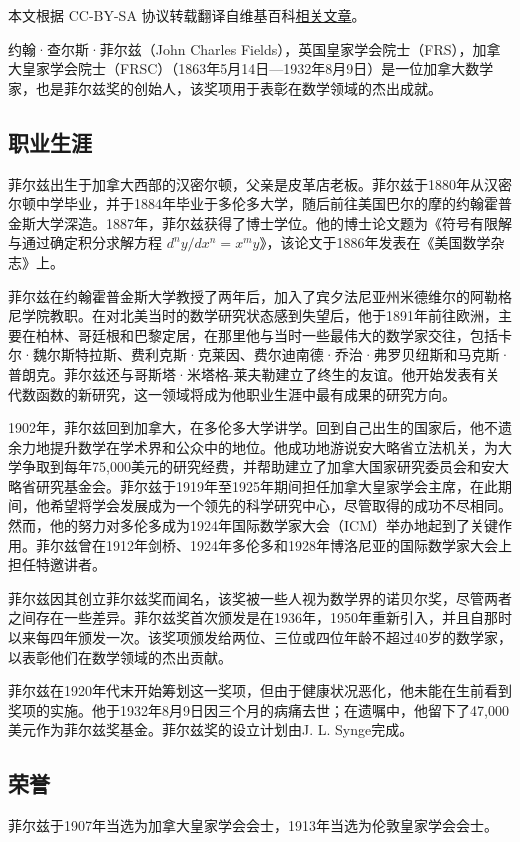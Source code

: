 
本文根据 CC-BY-SA 协议转载翻译自维基百科\href{https://en.wikipedia.org/wiki/John_Charles_Fields}{相关文章}。

约翰·查尔斯·菲尔兹（John Charles Fields），英国皇家学会院士（FRS），加拿大皇家学会院士（FRSC）（1863年5月14日—1932年8月9日）是一位加拿大数学家，也是菲尔兹奖的创始人，该奖项用于表彰在数学领域的杰出成就。
\subsection{职业生涯}  
菲尔兹出生于加拿大西部的汉密尔顿，父亲是皮革店老板。菲尔兹于1880年从汉密尔顿中学毕业，并于1884年毕业于多伦多大学，随后前往美国巴尔的摩的约翰霍普金斯大学深造。1887年，菲尔兹获得了博士学位。他的博士论文题为《符号有限解与通过确定积分求解方程 \(d^ny/dx^n = x^my\)》，该论文于1886年发表在《美国数学杂志》上。

菲尔兹在约翰霍普金斯大学教授了两年后，加入了宾夕法尼亚州米德维尔的阿勒格尼学院教职。在对北美当时的数学研究状态感到失望后，他于1891年前往欧洲，主要在柏林、哥廷根和巴黎定居，在那里他与当时一些最伟大的数学家交往，包括卡尔·魏尔斯特拉斯、费利克斯·克莱因、费尔迪南德·乔治·弗罗贝纽斯和马克斯·普朗克。菲尔兹还与哥斯塔·米塔格-莱夫勒建立了终生的友谊。他开始发表有关代数函数的新研究，这一领域将成为他职业生涯中最有成果的研究方向。

1902年，菲尔兹回到加拿大，在多伦多大学讲学。回到自己出生的国家后，他不遗余力地提升数学在学术界和公众中的地位。他成功地游说安大略省立法机关，为大学争取到每年75,000美元的研究经费，并帮助建立了加拿大国家研究委员会和安大略省研究基金会。菲尔兹于1919年至1925年期间担任加拿大皇家学会主席，在此期间，他希望将学会发展成为一个领先的科学研究中心，尽管取得的成功不尽相同。然而，他的努力对多伦多成为1924年国际数学家大会（ICM）举办地起到了关键作用。菲尔兹曾在1912年剑桥、1924年多伦多和1928年博洛尼亚的国际数学家大会上担任特邀讲者。

菲尔兹因其创立菲尔兹奖而闻名，该奖被一些人视为数学界的诺贝尔奖，尽管两者之间存在一些差异。菲尔兹奖首次颁发是在1936年，1950年重新引入，并且自那时以来每四年颁发一次。该奖项颁发给两位、三位或四位年龄不超过40岁的数学家，以表彰他们在数学领域的杰出贡献。

菲尔兹在1920年代末开始筹划这一奖项，但由于健康状况恶化，他未能在生前看到奖项的实施。他于1932年8月9日因三个月的病痛去世；在遗嘱中，他留下了47,000美元作为菲尔兹奖基金。菲尔兹奖的设立计划由J. L. Synge完成。
\subsection{荣誉}  
菲尔兹于1907年当选为加拿大皇家学会会士，1913年当选为伦敦皇家学会会士。

